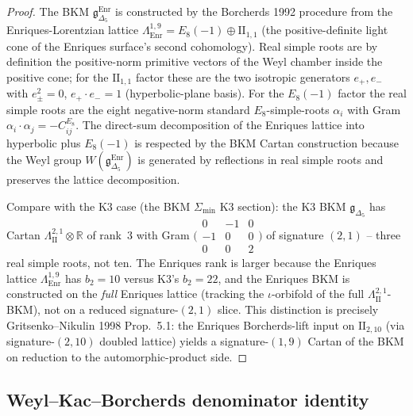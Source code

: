 \begin{proof}[Proof]
The BKM $\mathfrak{g}_{\Delta_5}^{\mathrm{Enr}}$ is constructed
by the Borcherds 1992 procedure from the Enriques-Lorentzian
lattice $\Lambda^{1,9}_{\mathrm{Enr}} = E_8(-1)\oplus\mathrm{II}_{1,1}$
(the positive-definite light cone of the Enriques surface's
second cohomology). Real simple roots are by definition the
positive-norm primitive vectors of the Weyl chamber inside the
positive cone; for the $\mathrm{II}_{1,1}$ factor these are the
two isotropic generators $e_+, e_-$ with $e_\pm^2 = 0$,
$e_+\cdot e_- = 1$ (hyperbolic-plane basis). For the $E_8(-1)$
factor the real simple roots are the eight negative-norm
standard $E_8$-simple-roots $\alpha_i$ with Gram
$\alpha_i\cdot\alpha_j = -C^{E_8}_{ij}$. The direct-sum
decomposition of the Enriques lattice into hyperbolic plus
$E_8(-1)$ is respected by the BKM Cartan construction because
the Weyl group $W(\mathfrak{g}_{\Delta_5}^{\mathrm{Enr}})$ is
generated by reflections in real simple roots and preserves the
lattice decomposition.

Compare with the K3 case
(the BKM $\Sigma_{\min}$ K3 section): the K3 BKM
$\mathfrak{g}_{\Delta_5}$ has Cartan
$\Lambda^{2,1}_{\mathrm{II}}\otimes\mathbb{R}$ of rank~$3$ with Gram
$\bigl(\begin{smallmatrix}0&-1&0\\-1&0&0\\0&0&2\end{smallmatrix}\bigr)$
of signature $(2,1)$ -- three real simple roots, not ten. The
Enriques rank is larger because the Enriques lattice
$\Lambda^{1,9}_{\mathrm{Enr}}$ has $b_2 = 10$ versus K3's
$b_2 = 22$, and the Enriques BKM is constructed on the
\emph{full} Enriques lattice (tracking the $\iota$-orbifold of
the full $\Lambda^{2,1}_{\mathrm{II}}$-BKM), not on a reduced
signature-$(2,1)$ slice. This distinction is precisely
Gritsenko--Nikulin 1998 Prop.~5.1: the Enriques Borcherds-lift
input on $\mathrm{II}_{2,10}$ (via signature-$(2,10)$ doubled
lattice) yields a signature-$(1,9)$ Cartan of the BKM on
reduction to the automorphic-product side.
\end{proof}

\subsection{Weyl--Kac--Borcherds denominator identity}
\label{subsec:bkm-enriques-denominator}

